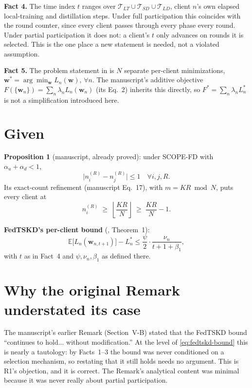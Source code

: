 \documentclass[11pt]{article}
\begin{document}
\textbf{Fact 4.} The time index $t$ ranges over $\mathcal{T}_{LT}\cup
\mathcal{T}_{SD}\cup\mathcal{T}_{LD}$, client $n$'s own elapsed
local-training and distillation steps. Under full participation this
coincides with the round counter, since every client passes through every
phase every round. Under partial participation it does not: a client's $t$
only advances on rounds it is selected. This is the one place a new
statement is needed, not a violated assumption.

\textbf{Fact 5.} The problem statement in \cite{mu2024fedtskd} is $N$
separate per-client minimizations, $\bm w^{*}=\arg\min_{\bm w}L_n(\bm
w),\,\forall n$. The manuscript's additive objective
$F(\{\bm w_n\})=\sum_n\lambda_n L_n(\bm w_n)$ (its Eq.~2) inherits this
directly, so $F^{*}=\sum_n\lambda_n L_n^{*}$ is not a simplification
introduced here.

\section{Given}

\textbf{Proposition 1} (manuscript, already proved): under SCOPE-FD with
$\alpha_u+\alpha_d<1$,
\begin{equation}
\bigl|n_i^{(R)}-n_j^{(R)}\bigr|\le 1 \quad\forall i,j,R.
\label{eq:spread}
\end{equation}
Its exact-count refinement (manuscript Eq.~17), with $m=KR\bmod N$, puts
every client at
\begin{equation}
n_i^{(R)} \;\ge\; \left\lfloor \frac{KR}{N} \right\rfloor \;\ge\; \frac{KR}{N}-1.
\label{eq:lowerbound}
\end{equation}

\textbf{FedTSKD's per-client bound} (\cite{mu2024fedtskd}, Theorem~1):
\begin{equation}
\mathbb{E}\bigl[L_n(\bm w_{n,t+1})\bigr] - L_n^{*} \le \frac{\psi}{2}\cdot\frac{\nu_n}{t+1+\beta_1},
\label{eq:fedtskd-bound}
\end{equation}
with $t$ as in Fact~4 and $\psi,\nu_n,\beta_1$ as defined there.

\section{Why the original Remark understated its case}

The manuscript's earlier Remark (Section~V-B) stated that the FedTSKD bound
``continues to hold... without modification.'' At the level of
\eqref{eq:fedtskd-bound} this is nearly a tautology: by Facts~1--3 the bound
was never conditioned on a selection mechanism, so restating that it still
holds needs no argument. This is R1's objection, and it is correct. The
Remark's analytical content was minimal because it was never really about
partial participation.
\end{document}

